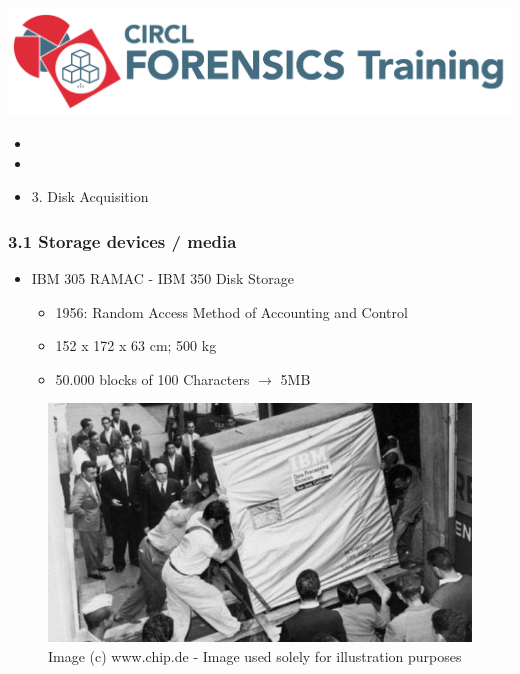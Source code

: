 %
%



\begin{frame}
    \includegraphics[scale=0.3]{images/logo-circl-Forensics.png}
    \begin{itemize}
        \item[]
        \item[]
        \item[] 3. Disk Acquisition
    \end{itemize}
\end{frame}


\begin{frame}[fragile]
  \frametitle{3.1 Storage devices / media}
    \begin{itemize}
        \item IBM 305 RAMAC - IBM 350 Disk Storage
        \begin{itemize}
            \item 1956: Random Access Method of Accounting and Control
            \item 152 x 172 x 63 cm; 500 kg
            \item 50.000 blocks of 100 Characters $\to$ 5MB
        \end{itemize}
    \end{itemize}
    \begin{figure}
        \includegraphics[scale=0.4, angle=0, trim=0 0 0 0]{images/IBM_305.jpeg}
        \captionsetup{labelformat=empty,labelsep=none}
        \caption[]{\tiny Image (c) www.chip.de - Image used solely for illustration purposes}
    \end{figure}
\end{frame}


